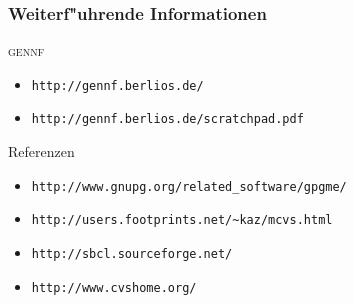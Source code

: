 \documentclass[german, presentation]{beamer}
\newcommand{\GENNF}{\textsc{gennf}}
\begin{document}

\begin{frame}
  \frametitle{Weiterf"uhrende Informationen}
  \begin{block}{\GENNF}
    \begin{itemize}
    \item \tt{http://gennf.berlios.de/}
    \item \tt{http://gennf.berlios.de/scratchpad.pdf}
    \end{itemize}
  \end{block}
  \begin{block}{Referenzen}
    \begin{itemize}
    \item \tt{http://www.gnupg.org/related\_software/gpgme/}
    \item \tt{http://users.footprints.net/\textasciitilde{}kaz/mcvs.html}
    \item \tt{http://sbcl.sourceforge.net/}
    \item \tt{http://www.cvshome.org/}
    \end{itemize}
  \end{block}
\end{frame}
\end{document}
